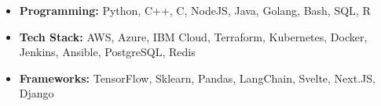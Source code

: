 \begin{itemize}[leftmargin=9pt,label=]
  \item \textbf{Programming:}
    Python, C++, C, NodeJS, Java, Golang, Bash, SQL, R
  \item \textbf{Tech Stack:}
    AWS,
    Azure,
    IBM Cloud,
    Terraform,
    Kubernetes,
    Docker,
    Jenkins,
    Ansible,
    PostgreSQL,
    Redis
  \item \textbf{Frameworks:}
    TensorFlow,
    Sklearn,
    Pandas,
    LangChain,
    Svelte,
    Next.JS,
    Django
\end{itemize}

\vspace{0.1cm} \par
